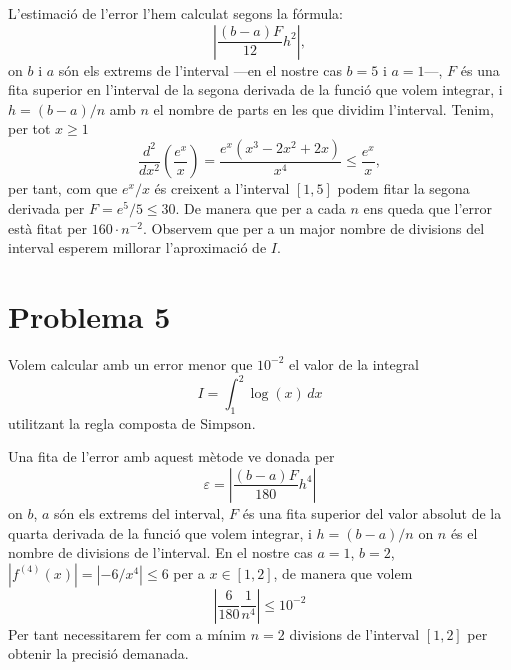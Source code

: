 \documentclass[12pt]{article}
\numberwithin{table}{section}
\numberwithin{figure}{section}
\numberwithin{equation}{section}
\newcommand{\abs}[1]{\left\lvert #1 \right\rvert}
\begin{document}
L'estimació de l'error l'hem calculat segons la fórmula:
\begin{equation*}
	\abs{\dfrac{(b-a)F}{12}h^2},
\end{equation*}
on $b$ i $a$ són els extrems de l'interval ---en el nostre cas $b=5$ i $a=1$---, $F$ és una fita superior en l'interval de la segona derivada de la funció que volem integrar, i $h=(b-a)/n$ amb \( n \) el nombre de parts en les que dividim l'interval. Tenim, per tot \( x \geq 1 \) 
\begin{equation*}
	\frac{d^2}{dx^2}\left(\frac{e^x}{x}\right) = \dfrac{e^x(x^3-2x^2+2x)}{x^4} \leq \dfrac{e^x}{x},
\end{equation*}
per tant, com que \( e^{x}/x \) és creixent a l'interval \( [1,5] \) podem fitar la segona derivada per $F=e^5/5 \leq 30$. De manera que per a cada $n$ ens queda que l'error està fitat per \( 160 \cdot n^{-2} \). Observem que per a un major nombre de divisions del interval esperem millorar l'aproximació de $I$.

\newpage

\section{Problema 5}
Volem calcular amb un error menor que $10^{-2}$ el valor de la integral
\begin{equation*}
	I = \int_{1}^{2}\log(x) \, dx
\end{equation*}
utilitzant la regla composta de Simpson.

Una fita de l'error amb aquest mètode ve donada per
\begin{equation*}
	\varepsilon = \abs{\dfrac{(b-a)F}{180}h^4 } 
\end{equation*}
on $b$, $a$ són els extrems del interval, $F$ és una fita superior del valor absolut de la quarta derivada de la funció que volem integrar, i $h=(b-a)/n$ on $n$ és el nombre de divisions de l'interval. En el nostre cas $a=1$, $b=2$, $|f^{(4)}(x)|=|-6/x^4|\leq6$ per a $x\in[1,2]$, de manera que volem
\begin{equation*}
	\abs{\frac{6}{180} \dfrac{1}{n^4}} \leq 10^{-2} 
\end{equation*}
Per tant necessitarem fer com a mínim $n=2$ divisions de l'interval $[1,2]$ per obtenir la precisió demanada.
\end{document}
